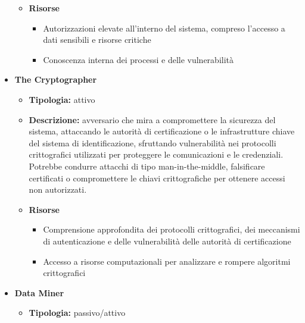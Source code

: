 \begin{itemize}
\begin{itemize}
                \item \textbf{Risorse}
                    \begin{itemize}
                        \item Autorizzazioni elevate all'interno del sistema, compreso l'accesso a dati sensibili e risorse critiche

                        \vspace{3mm}

                        \item Conoscenza interna dei processi e delle vulnerabilità
                    \end{itemize}
            \end{itemize}


        \item \textbf{The Cryptographer}
            \begin{itemize}
                \item \textbf{Tipologia:} attivo
                
                \item \textbf{Descrizione:} avversario che mira a compromettere la sicurezza del sistema, attaccando le autorità di certificazione o le infrastrutture chiave del sistema di identificazione, sfruttando vulnerabilità nei protocolli crittografici utilizzati per proteggere le comunicazioni e le credenziali.
                Potrebbe condurre attacchi di tipo man-in-the-middle, falsificare certificati o compromettere le chiavi crittografiche per ottenere accessi non autorizzati.
                
                \item \textbf{Risorse}
                    \begin{itemize}
                        \item Comprensione approfondita dei protocolli crittografici, dei meccanismi di autenticazione e delle vulnerabilità delle autorità di certificazione

                        \vspace{3mm}

                        \item Accesso a risorse computazionali per analizzare e rompere algoritmi crittografici
                    \end{itemize}
            \end{itemize}


        \item \textbf{Data Miner}
            \begin{itemize}
                \item \textbf{Tipologia:} passivo/attivo


\end{itemize}
\end{itemize}
